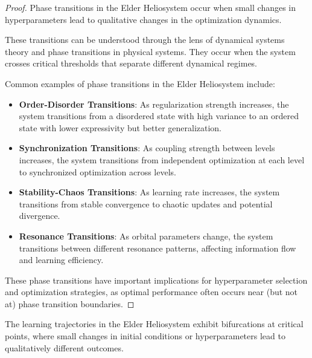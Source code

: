 \begin{proof}
Phase transitions in the Elder Heliosystem occur when small changes in hyperparameters lead to qualitative changes in the optimization dynamics.

These transitions can be understood through the lens of dynamical systems theory and phase transitions in physical systems. They occur when the system crosses critical thresholds that separate different dynamical regimes.

Common examples of phase transitions in the Elder Heliosystem include:
\begin{itemize}
    \item \textbf{Order-Disorder Transitions}: As regularization strength increases, the system transitions from a disordered state with high variance to an ordered state with lower expressivity but better generalization.
    \item \textbf{Synchronization Transitions}: As coupling strength between levels increases, the system transitions from independent optimization at each level to synchronized optimization across levels.
    \item \textbf{Stability-Chaos Transitions}: As learning rate increases, the system transitions from stable convergence to chaotic updates and potential divergence.
    \item \textbf{Resonance Transitions}: As orbital parameters change, the system transitions between different resonance patterns, affecting information flow and learning efficiency.
\end{itemize}

These phase transitions have important implications for hyperparameter selection and optimization strategies, as optimal performance often occurs near (but not at) phase transition boundaries.
\end{proof}

\begin{theorem}
The learning trajectories in the Elder Heliosystem exhibit bifurcations at critical points, where small changes in initial conditions or hyperparameters lead to qualitatively different outcomes.
\end{theorem}

